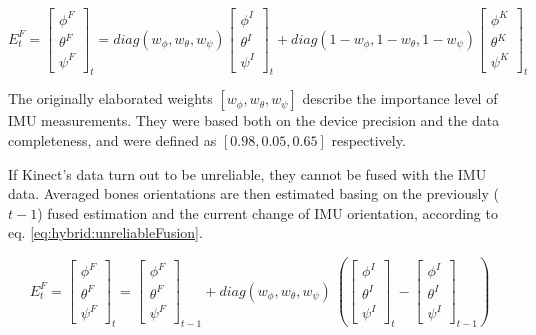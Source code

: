 \documentclass[sensors,article,submit,moreauthors,pdftex,10pt,a4paper]{mdpi}
\begin{document}
\begin{equation} E^F_t = 
	\begin{bmatrix}  \phi^F \\  \theta^F \\  \psi^F \end{bmatrix}_t = 
	diag(w_\phi,w_\theta,w_\psi)
	\begin{bmatrix}  \phi^I \\  \theta^I \\  \psi^I \end{bmatrix}_t + 
	diag(1-w_\phi,1-w_\theta,1-w_\psi)
	\begin{bmatrix}  \phi^K \\  \theta^K \\  \psi^K \end{bmatrix}_t
	\label{eq:hybrid:reliableFusion}
\end{equation}
		
The originally elaborated weights $[w_\phi , w_\theta , w_\psi]$ describe the importance level of IMU measurements. They were based both on the device precision and the data completeness, and were defined as $[0.98, 0.05, 0.65]$ respectively. 
		
If Kinect’s data turn out to be unreliable, they cannot be fused with the IMU data. Averaged bones orientations are then estimated basing on the previously ($t-1$) fused estimation and the current change of IMU orientation, according to eq. \ref{eq:hybrid:unreliableFusion}.
				
\begin{equation} 
	\label{eq:hybrid:unreliableFusion}
	E^F_t = 
	\begin{bmatrix}  \phi^F \\  \theta^F \\  \psi^F \end{bmatrix}_t = 
	\begin{bmatrix}  \phi^F \\  \theta^F \\  \psi^F \end{bmatrix}_{t-1} +
	diag(w_\phi,w_\theta,w_\psi)\
	(\begin{bmatrix}  \phi^I \\  \theta^I \\  \psi^I \end{bmatrix}_t -
	\begin{bmatrix}  \phi^I \\  \theta^I \\  \psi^I \end{bmatrix}_{t-1})
\end{equation}
		
\end{document}
